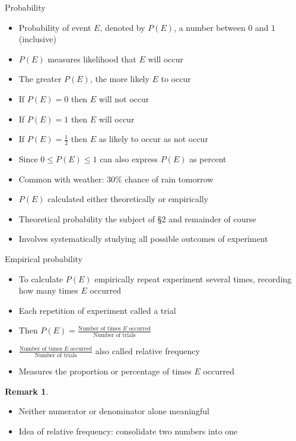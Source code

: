 \documentclass{beamer}
\theoremstyle{definition}
\newtheorem{remark}{Remark}
\begin{document}
\begin{frame}{Probability}
\begin{itemize}
\item \alert{Probability of event $E$}, denoted by $P\left(E\right)$,
a number between $0$ and $1$ (inclusive)
\item $P\left(E\right)$ measures likelihood that $E$ will occur
\item The greater $P\left(E\right)$, the more likely $E$ to occur
\item If $P\left(E\right)=0$ then $E$ will not occur
\item If $P\left(E\right)=1$ then $E$ will occur
\item If $P\left(E\right)=\frac{1}{2}$ then $E$ 
as likely to occur as not occur
\item Since $0\le P\left(E\right)\le 1$ can also express
$P\left(E\right)$ as percent
\item Common with weather: \alert{$30\%$ chance of rain tomorrow}
\item $P\left(E\right)$ calculated either \alert{theoretically}
or \alert{empirically}
\item Theoretical probability the subject of \S2 and remainder of course
\item Involves systematically studying all possible outcomes of experiment
\end{itemize}
\end{frame}

\begin{frame}{Empirical probability}
\begin{itemize}
\item To calculate $P\left(E\right)$ \alert{empirically}
repeat experiment several times, recording how
many times $E$ occurred
\item Each repetition of experiment called a \alert{trial}
\item Then $P\left(E\right)=
\frac{\text{Number of times $E$ occurred}}
{\text{Number of trials}}$
\item $\frac{\text{Number of times $E$ occurred}}
{\text{Number of trials}}$ also called
\alert{relative frequency}
\item Measures the \alert{proportion} or \alert{percentage}
of times $E$ occurred
\end{itemize}
\begin{remark}
\begin{itemize}
\item Neither numerator or denominator alone meaningful
\item Idea of relative frequency: consolidate two numbers into one
\end{itemize}
\end{remark}
\end{frame}
\end{document}
